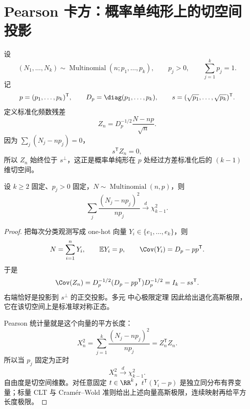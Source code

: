 \section{Pearson 卡方：概率单纯形上的切空间投影}

\begin{definition}[单纯形中的标准化计数波动]
设
\[
 (N_1,\ldots,N_k)
 \sim\operatorname{Multinomial}(n;p_1,\ldots,p_k),
 \qquad
 p_j>0,
 \qquad
 \sum_{j=1}^kp_j=1.
\]
记
\[
 p=(p_1,\ldots,p_k)^{\mathsf T},
 \qquad
 D_p=\diag(p_1,\ldots,p_k),
 \qquad
 s=(\sqrt{p_1},\ldots,\sqrt{p_k})^{\mathsf T}.
\]
定义标准化频数残差
\begin{equation*}Z_n
 =D_p^{-1/2}\frac{N-np}{\sqrt n}.
\end{equation*}
因为 $\sum_j(N_j-np_j)=0$，
\[
 s^{\mathsf T}Z_n=0,
\]
所以 $Z_n$ 始终位于 $s^\perp$，这正是概率单纯形在 $p$ 处经过方差标准化后的 $(k-1)$ 维切空间。
\end{definition}


\begin{theorem}
设 $k\ge2$ 固定、$p_j>0$ 固定，$N\sim\operatorname{Multinomial}(n,p)$，则
\[
 \sum_j\frac{(N_j-np_j)^2}{np_j}\xrightarrow{d}\chi^2_{k-1}.
\]
\end{theorem}
\begin{proof}
把每次分类观测写成 one-hot 向量 $Y_i\in\{e_1,\ldots,e_k\}$，则
\[
 N=\sum_{i=1}^nY_i,
 \qquad
 \mathbb E Y_i=p,
 \qquad
 \Cov(Y_i)=D_p-pp^{\mathsf T}.
\]
于是
\begin{equation*}\Cov(Z_n)
 =D_p^{-1/2}(D_p-pp^{\mathsf T})D_p^{-1/2}
 =I_k-ss^{\mathsf T}.
\end{equation*}
右端恰好是投影到 $s^\perp$ 的正交投影。多元 中心极限定理 因此给出退化高斯极限，它在该切空间上是标准球对称正态。

Pearson 统计量就是这个向量的平方长度：
\begin{equation}\label{eq:math-stat-pearson-quadratic-form}
 X_n^2
 =\sum_{j=1}^k\frac{(N_j-np_j)^2}{np_j}
 =Z_n^{\mathsf T}Z_n.
\end{equation}
所以当 $p_j$ 固定为正时
\begin{equation*}X_n^2\xrightarrow{d}\chi^2_{k-1}.
\end{equation*}
自由度是切空间维数。对任意固定 $t\in\RR^k$，$t^{\mathsf T}(Y_i-p)$ 是独立同分布有界变量；标量 CLT 与 Cramér--Wold 准则给出上述向量高斯极限，连续映射再给平方长度极限。
\end{proof}

